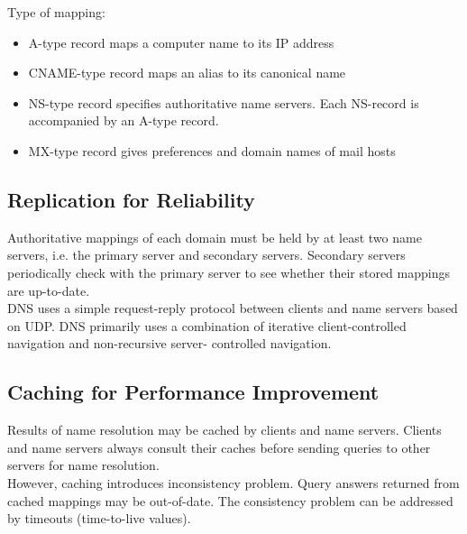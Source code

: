 \begin{multicols*}{2}
\noindent Type of mapping:
\begin{itemize}
  \item A-type record maps a computer name to its IP address
  \item CNAME-type record maps an alias to its canonical name
  \item NS-type record specifies authoritative name servers. Each NS-record is accompanied by an A-type record.
  \item MX-type record gives preferences and domain names of mail hosts
\end{itemize}

\subsection{Replication for Reliability}

\noindent Authoritative mappings of each domain must be held by at least two name servers, i.e. the primary server and secondary servers. Secondary servers periodically check with the primary server to see whether their stored mappings are up-to-date. \\

\noindent DNS uses a simple request-reply protocol between clients and name servers based on UDP. DNS primarily uses a combination of iterative client-controlled navigation and non-recursive server- controlled navigation. 

\subsection{Caching for Performance Improvement}

\noindent Results of name resolution may be cached by clients and name servers. Clients and name servers always consult their caches before sending queries to other servers for name resolution. \\

\noindent However, caching introduces inconsistency problem. Query answers returned from cached mappings may be out-of-date. The consistency problem can be addressed by timeouts (time-to-live values).

\end{multicols*}
